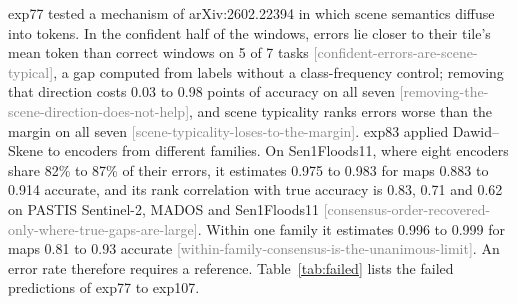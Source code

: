 \documentclass[11pt,a4paper]{article}
\newcommand{\claim}[1]{{\scriptsize\textsf{\textcolor{gray}{[#1]}}}}
\begin{document}
exp77 tested a mechanism of arXiv:2602.22394 in which scene semantics diffuse into tokens. In the confident half of the
windows, errors lie closer to their tile's mean token than correct windows on 5 of 7 tasks
\claim{confident-errors-are-scene-typical}, a gap computed from labels without a class-frequency control; removing that
direction costs 0.03 to 0.98 points of accuracy on all seven \claim{removing-the-scene-direction-does-not-help}, and
scene typicality ranks errors worse than the margin on all seven \claim{scene-typicality-loses-to-the-margin}. exp83
applied Dawid--Skene to encoders from different families. On Sen1Floods11, where eight encoders share 82\% to 87\% of
their errors, it estimates 0.975 to 0.983 for maps 0.883 to 0.914 accurate, and its rank correlation with true accuracy
is 0.83, 0.71 and 0.62 on PASTIS Sentinel-2, MADOS and Sen1Floods11 \claim{consensus-order-recovered-only-where-true-gaps-are-large}.
Within one family it estimates 0.996 to 0.999 for maps 0.81 to 0.93 accurate
\claim{within-family-consensus-is-the-unanimous-limit}. An error rate therefore requires a reference.
Table~\ref{tab:failed} lists the failed predictions of exp77 to exp107.
\end{document}
